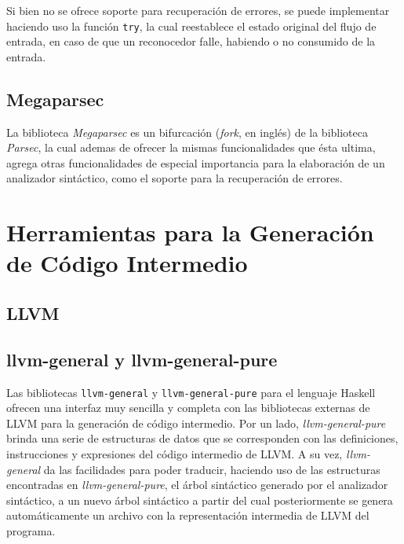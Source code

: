 Si bien no se ofrece soporte para recuperación de errores, se puede
implementar haciendo uso la función \texttt{try}, la cual reestablece el
estado original del flujo de entrada, en caso de que un reconocedor falle,
habiendo o no consumido de la entrada.

\subsection{Megaparsec}
La biblioteca \textit{Megaparsec} es un bifurcación (\emph{fork}, en inglés)
de la biblioteca \textit{Parsec}, la cual ademas de ofrecer la mismas
funcionalidades que ésta ultima, agrega otras funcionalidades de especial
importancia para la elaboración de un analizador sintáctico, como el soporte
para la recuperación de errores.



\section{Herramientas para la Generación de Código Intermedio}

\subsection{LLVM}

\subsection{llvm-general y llvm-general-pure}

Las bibliotecas \texttt{llvm-general} y \texttt{llvm-general-pure} para el
lenguaje Haskell ofrecen una interfaz muy sencilla y completa con las
bibliotecas externas de LLVM para la generación de código intermedio. Por un
lado, \textit{llvm-general-pure} brinda una serie de estructuras de datos que se
corresponden con las definiciones, instrucciones y expresiones del código
intermedio de LLVM. A su vez, \textit{llvm-general} da las facilidades para
poder traducir, haciendo uso de las estructuras encontradas en
\textit{llvm-general-pure}, el árbol sintáctico generado por el analizador
sintáctico, a un nuevo árbol sintáctico a partir del cual posteriormente se
genera automáticamente un archivo con la representación intermedia de LLVM del
programa.


